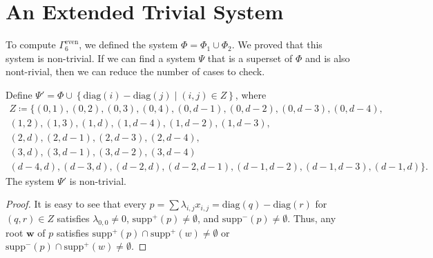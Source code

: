  
  



\section{An Extended Trivial System}

To compute \(  \Gamma^{\mathrm{even}}_6 \), we defined the system \( \Phi = \Phi_1 \cup \Phi_2 \). We proved that this system is non-trivial. If we can find a system \( \Psi \) that is a superset of \( \Phi \) and is also nont-rivial, then we can reduce the number of cases to check. 

\begin{proposition}
    Define \( \Psi' = \Phi \cup \left\{ \mathrm{diag}(i) - \mathrm{diag}(j) \mid (i,j) \in Z \right\} \), where 
    \begin{gather*}
        Z \coloneqq \{ (0,1), (0,2), (0,3), (0,4), (0,d-1), (0,d-2), (0,d-3), (0,d-4),\\ (1,2), (1,3), (1, d), (1,d-4), (1,d-2), (1,d-3),\\ (2,d), (2,d-1), (2,d-3), (2, d-4),\\ (3,d), (3,d-1), (3,d-2), (3, d-4)\\
        (d-4,d), (d-3,d), (d-2,d), (d-2,d-1), (d-1,d-2), (d-1,d-3), (d-1,d)\}.
    \end{gather*}
    The system \( \Psi' \) is non-trivial.
\end{proposition}

\begin{proof}
    It is easy to see that every \( p = \sum \lambda_{i,j} x_{i,j} = \mathrm{diag}(q) - \mathrm{diag}(r) \) for \( (q,r) \in Z \) satisfies \( \lambda_{0,0} \neq 0 \), \( \mathrm{supp}^+(p) \neq \emptyset \), and \( \mathrm{supp}^-(p) \neq \emptyset \). Thus, any root \( \mathbf{w} \) of \( p \) satisfies \( \mathrm{supp}^+(p) \cap \mathrm{supp}^+(w) \neq \emptyset \) or \( \mathrm{supp}^-(p) \cap \mathrm{supp}^+(w) \neq \emptyset \).
\end{proof}

